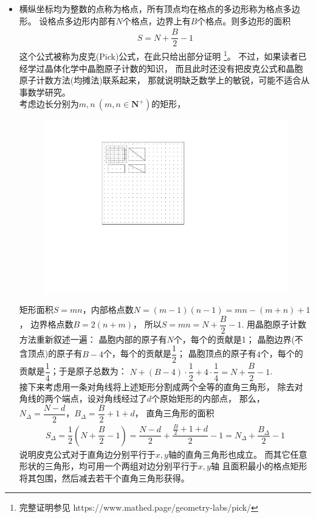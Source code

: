 \begin{itemize}[leftmargin=\inteval{\myitemleftmargin}pt,itemsep=
   \inteval{\myitemitempsep}pt,topsep=\inteval{\myitemtopsep}pt]
\item 横纵坐标均为整数的点称为格点，所有顶点均在格点的多边形称为格点多边形。
设格点多边形内部有$ N $个格点，边界上有$ B $个格点。则多边形的面积
\begin{gather}\label{格点面积皮克公式}
    S=N+\dfrac{B}{2}-1
\end{gather}
这个公式被称为皮克(Pick)公式，在此只给出部分证明
\footnote{完整证明参见 https://www.mathed.page/geometry-labs/pick/}。
不过，如果读者已经学过晶体化学中晶胞原子计数的知识，
而且此时还没有把皮克公式和晶胞原子计数方法(均摊法)联系起来，
那就说明缺乏数学上的敏锐，可能不适合从事数学研究。\\
考虑边长分别为$ m,n\ (m,n\in \mathbf{N}^+) $的矩形，
\begin{figure}[H]
    \centering
    \includegraphics[width=0.7\linewidth]{PDF_Picture/格点多边形-皮克公式}
\end{figure}
矩形面积$ S=mn $，内部格点数$ N=(m-1)(n-1)=mn-(m+n)+1 $，
边界格点数$ B=2(n+m) $，
所以$ S=mn=N+\dfrac{B}{2}-1 $. 
用晶胞原子计数方法重新叙述一遍：
晶胞内部的原子有$ N $个，每个的贡献是1；
晶胞边界(不含顶点)的原子有$ B-4 $个，每个的贡献是$ \dfrac{1}{2} $；
晶胞顶点的原子有$ 4 $个，每个的贡献是$ \dfrac{1}{4} $；于是原子总数为：
$ N+(B-4)\cdot\dfrac{1}{2}+4\cdot \dfrac{1}{4}=N+\dfrac{B}{2}-1 $.\\
接下来考虑用一条对角线将上述矩形分割成两个全等的直角三角形，
除去对角线的两个端点，设对角线经过了$ d $个原始矩形的内部点，
那么，$ N_{\Delta}=\dfrac{N-d}{2} $，$ B_{\Delta}=\dfrac{B}{2}+1+d $，
直角三角形的面积
\begin{gather*}
    S_{\Delta}=\dfrac{1}{2}\left(N+\dfrac{B}{2}-1\right)
    =\dfrac{N-d}{2}+\dfrac{\frac{B}{2}+1+d}{2}-1=
    N_{\Delta}+\dfrac{B_{\Delta}}{2}-1
\end{gather*}
说明皮克公式对于直角边分别平行于$ x,y $轴的直角三角形也成立。
而其它任意形状的三角形，均可用一个两组对边分别平行于$ x,y $轴
且面积最小的格点矩形将其包围，然后减去若干个直角三角形获得。

\end{itemize}

